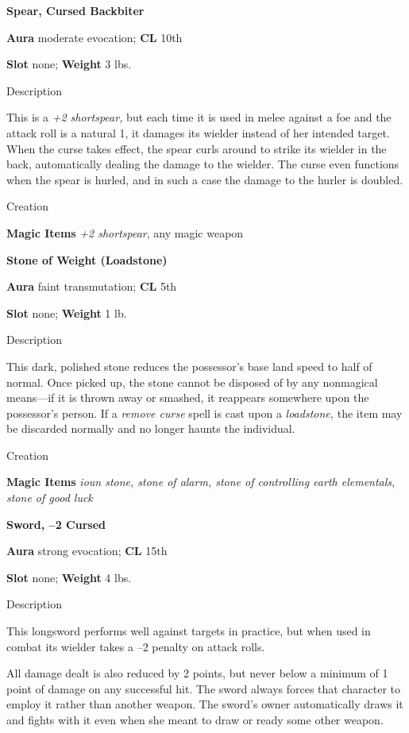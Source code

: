 \textbf{Spear, Cursed Backbiter}
				
\textbf{Aura} moderate evocation; \textbf{CL} 10th
				
\textbf{Slot} none; \textbf{Weight }3 lbs.
				
Description
				
This is a \textit{+2 shortspear, }but each time it is used in melee against a foe and the attack roll is a natural 1, it damages its wielder instead of her intended target. When the curse takes effect, the spear curls around to strike its wielder in the back, automatically dealing the damage to the wielder. The curse even functions when the spear is hurled, and in such a case the damage to the hurler is doubled. 
				
Creation
				
\textbf{Magic Items}\textit{ +2 shortspear}, any magic weapon
				
\textbf{Stone of Weight (Loadstone)}
				
\textbf{Aura} faint transmutation; \textbf{CL} 5th
				
\textbf{Slot} none; \textbf{Weight }1 lb.
				
Description
				
This dark, polished stone reduces the possessor's base land speed to half of normal. Once picked up, the stone cannot be disposed of by any nonmagical means---if it is thrown away or smashed, it reappears somewhere upon the possessor's person. If a \textit{remove curse }spell is cast upon a \textit{loadstone, }the item may be discarded normally and no longer haunts the individual. 
				
Creation
				
\textbf{Magic Items}\textit{ ioun stone, stone of alarm, stone of controlling earth elementals, stone of good luck}
				
\textbf{Sword, --2 Cursed}
				
\textbf{Aura} strong evocation; \textbf{CL} 15th
				
\textbf{Slot} none; \textbf{Weight }4 lbs.
				
Description
				
This longsword performs well against targets in practice, but when used in combat its wielder takes a --2 penalty on attack rolls.
				
All damage dealt is also reduced by 2 points, but never below a minimum of 1 point of damage on any successful hit. The sword always forces that character to employ it rather than another weapon. The sword's owner automatically draws it and fights with it even when she meant to draw or ready some other weapon.
				
